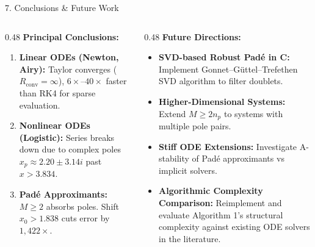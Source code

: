 \documentclass[aspectratio=169]{beamer}
\newcommand{\Rconv}{R_{\mathrm{conv}}}
\begin{document}
\begin{frame}{7. Conclusions \& Future Work}
  \small
  \begin{columns}[T]
    \begin{column}{0.48\textwidth}
      \textbf{Principal Conclusions:}
      \begin{enumerate}\small
        \item \textbf{Linear ODEs (Newton, Airy):} Taylor converges ($\Rconv=\infty$), $6\times$--$40\times$ faster than RK4 for sparse evaluation.
        \item \textbf{Nonlinear ODEs (Logistic):} Series breaks down due to complex poles $x_p \approx 2.20 \pm 3.14i$ past $x > 3.834$.
        \item \textbf{Padé Approximants:} $M \geq 2$ absorbs poles. Shift $x_0 > 1.838$ cuts error by $1,422\times$.
      \end{enumerate}
    \end{column}
    \begin{column}{0.48\textwidth}
      \textbf{Future Directions:}
      \begin{itemize}\small
        \item \textbf{SVD-based Robust Padé in C:} Implement Gonnet--Güttel--Trefethen SVD algorithm to filter doublets.
        \item \textbf{Higher-Dimensional Systems:} Extend $M \ge 2n_p$ to systems with multiple pole pairs.
        \item \textbf{Stiff ODE Extensions:} Investigate A-stability of Padé approximants vs implicit solvers.
        \item \textbf{Algorithmic Complexity Comparison:} Reimplement and evaluate Algorithm 1's structural complexity against existing ODE solvers in the literature.
      \end{itemize}
    \end{column}
  \end{columns}
  \vskip4pt
\end{frame}
\end{document}
